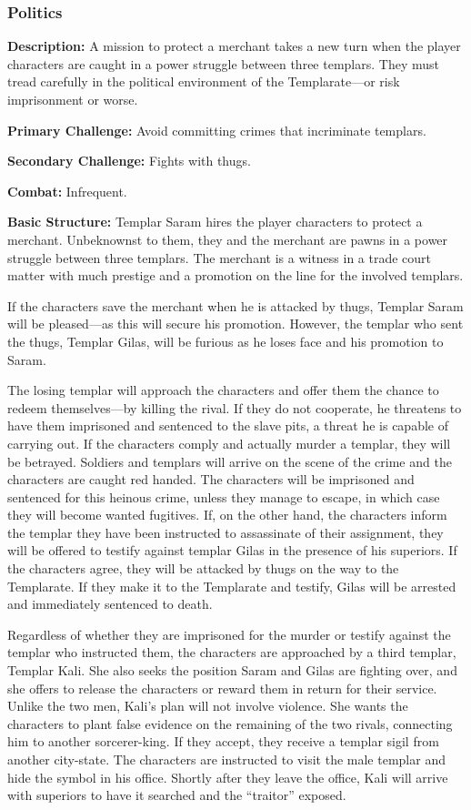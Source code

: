 \subsubsection{Politics}

\textbf{Description:} A mission to protect a merchant takes a new turn when the player characters are caught in a power struggle between three templars. They must tread carefully in the political environment of the Templarate---or risk imprisonment or worse.

\textbf{Primary Challenge:} Avoid committing crimes that incriminate templars.

\textbf{Secondary Challenge:} Fights with thugs.

\textbf{Combat:} Infrequent.

\textbf{Basic Structure:} Templar Saram hires the player characters to protect a merchant. Unbeknownst to them, they and the merchant are pawns in a power struggle between three templars. The merchant is a witness in a trade court matter with much prestige and a promotion on the line for the involved templars.

If the characters save the merchant when he is attacked by thugs, Templar Saram will be pleased---as this will secure his promotion. However, the templar who sent the thugs, Templar Gilas, will be furious as he loses face and his promotion to Saram.

The losing templar will approach the characters and offer them the chance to redeem themselves---by killing the rival. If they do not cooperate, he threatens to have them imprisoned and sentenced to the slave pits, a threat he is capable of carrying out. If the characters comply and actually murder a templar, they will be betrayed. Soldiers and templars will arrive on the scene of the crime and the characters are caught red handed. The characters will be imprisoned and sentenced for this heinous crime, unless they manage to escape, in which case they will become wanted fugitives. If, on the other hand, the characters inform the templar they have been instructed to assassinate of their assignment, they will be offered to testify against templar Gilas in the presence of his superiors. If the characters agree, they will be attacked by thugs on the way to the Templarate. If they make it to the Templarate and testify, Gilas will be arrested and immediately sentenced to death.

Regardless of whether they are imprisoned for the murder or testify against the templar who instructed them, the characters are approached by a third templar, Templar Kali. She also seeks the position Saram and Gilas are fighting over, and she offers to release the characters or reward them in return for their service. Unlike the two men, Kali's plan will not involve violence. She wants the characters to plant false evidence on the remaining of the two rivals, connecting him to another sorcerer-king. If they accept, they receive a templar sigil from another city-state. The characters are instructed to visit the male templar and hide the symbol in his office. Shortly after they leave the office, Kali will arrive with superiors to have it searched and the ``traitor'' exposed.

